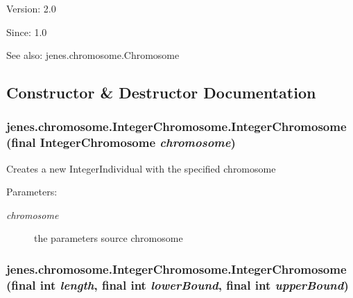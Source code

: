 \begin{Desc}
\item[Version:]2.0 \end{Desc}
\begin{Desc}
\item[Since:]1.0\end{Desc}
\begin{Desc}
\item[See also:]jenes.chromosome.Chromosome \end{Desc}


\subsection{Constructor \& Destructor Documentation}
\hypertarget{classjenes_1_1chromosome_1_1_integer_chromosome_10f477c2c6fb3893a0fc331a933e5b39}{
\subsubsection[IntegerChromosome]{\setlength{\rightskip}{0pt plus 5cm}jenes.chromosome.IntegerChromosome.IntegerChromosome (final {\bf IntegerChromosome} {\em chromosome})}}
\label{classjenes_1_1chromosome_1_1_integer_chromosome_10f477c2c6fb3893a0fc331a933e5b39}


Creates a new IntegerIndividual with the specified chromosome 

\begin{Desc}
\item[Parameters:]
\begin{description}
\item[{\em chromosome}]the parameters source chromosome \end{description}
\end{Desc}
\hypertarget{classjenes_1_1chromosome_1_1_integer_chromosome_44849b4866ead257aacae333ad7737bd}{
\subsubsection[IntegerChromosome]{\setlength{\rightskip}{0pt plus 5cm}jenes.chromosome.IntegerChromosome.IntegerChromosome (final int {\em length}, \/  final int {\em lowerBound}, \/  final int {\em upperBound})}}
\label{classjenes_1_1chromosome_1_1_integer_chromosome_44849b4866ead257aacae333ad7737bd}


